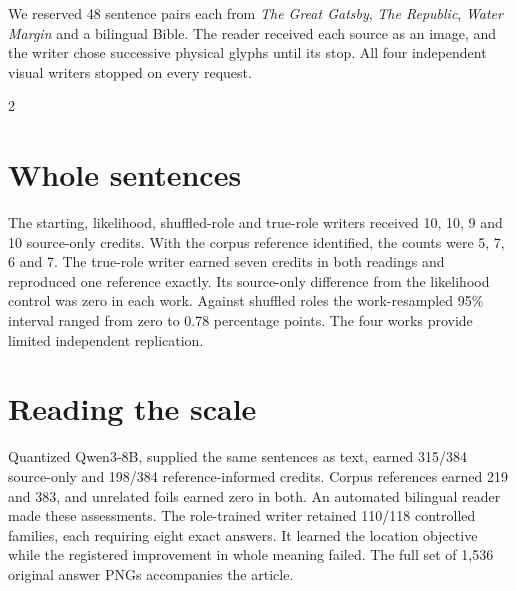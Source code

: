\newpage
{}
\noindent We reserved 48 sentence pairs each from \emph{The Great Gatsby}, \emph{The Republic}, \emph{Water Margin} and a bilingual Bible. The reader received each source as an image, and the writer chose successive physical glyphs until its stop. All four independent visual writers stopped on every request.
\begin{multicols}{2}
\section*{Whole sentences}
The starting, likelihood, shuffled-role and true-role writers received 10, 10, 9 and 10 source-only credits. With the corpus reference identified, the counts were 5, 7, 6 and 7. The true-role writer earned seven credits in both readings and reproduced one reference exactly. Its source-only difference from the likelihood control was zero in each work. Against shuffled roles the work-resampled 95\% interval ranged from zero to 0.78 percentage points. The four works provide limited independent replication.
\section*{Reading the scale}
Quantized Qwen3-8B, supplied the same sentences as text, earned 315/384 source-only and 198/384 reference-informed credits. Corpus references earned 219 and 383, and unrelated foils earned zero in both. An automated bilingual reader made these assessments. The role-trained writer retained 110/118 controlled families, each requiring eight exact answers. It learned the location objective while the registered improvement in whole meaning failed. The full set of 1,536 original answer PNGs accompanies the article.
\end{multicols}
